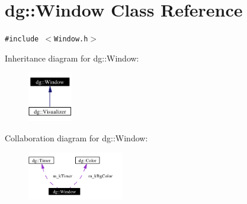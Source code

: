 \section{dg::Window Class Reference}
\label{classdg_1_1Window}
{\tt \#include $<$Window.h$>$}

Inheritance diagram for dg::Window:\begin{figure}[H]
\begin{center}
\leavevmode
\includegraphics[width=55pt]{classdg_1_1Window__inherit__graph}
\end{center}
\end{figure}
Collaboration diagram for dg::Window:\begin{figure}[H]
\begin{center}
\leavevmode
\includegraphics[width=119pt]{classdg_1_1Window__coll__graph}
\end{center}
\end{figure}
